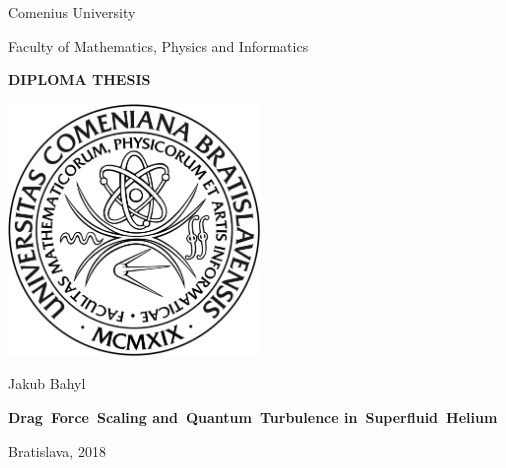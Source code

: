 \begin{center}
	\Large\sf
	Comenius University

	Faculty of Mathematics, Physics and Informatics
	\bigskip

	{
		\Huge \bfseries \sffamily DIPLOMA THESIS
	}

	\vfill

	\includegraphics[width=0.5\textwidth]{graphics/fmfi_logo.jpg}

	\vfill

	{
		\Huge\sf Jakub Bahyl
	}

	\vfill

	{
		\Huge \bfseries \sffamily
		\mbox{Drag Force Scaling}
		\vspace{1mm}
		\mbox{and Quantum Turbulence}
		\mbox{in Superfluid Helium}
	}

	\vfill

	\Large\sf
	Bratislava, 2018

\end{center}

\newpage
